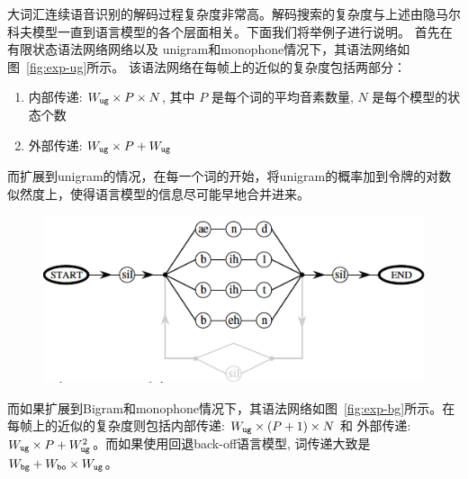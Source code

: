 大词汇连续语音识别的解码过程复杂度非常高。解码搜索的复杂度与上述由隐马尔科夫模型一直到语言模型的各个层面相关。下面我们将举例子进行说明。
首先在有限状态语法网络网络以及 unigram和monophone情况下，其语法网络如图~\ref{fig:exp-ug}所示。
该语法网络在每帧上的近似的复杂度包括两部分：
\begin{enumerate}
\item 内部传递: $W_{\tt ug}\times P\times N$, 其中 $P$ 是每个词的平均音素数量, $N$ 是每个模型的状态个数
\item 外部传递: $W_{\tt ug}\times P + W_{\tt ug}$ 
\end{enumerate}
而扩展到unigram的情况，在每一个词的开始，将unigram的概率加到令牌的对数似然度上，使得语言模型的信息尽可能早地合并进来。

\begin{figure}[!htp]
  \centering
    \captionstyle{\centering}
    \includegraphics[clip=true, width=\textwidth]{figure/ug.png}
\end{figure}

而如果扩展到Bigram和monophone情况下，其语法网络如图~\ref{fig:exp-bg}所示。在每帧上的近似的复杂度则包括内部传递: $W_{\tt ug}\times (P+1)\times N$ 和 外部传递: $W_{\tt ug}\times P + W_{\tt ug}^2$。而如果使用回退back-off语言模型, 词传递大致是 $W_{\tt bg}+W_{\tt bo}\times W_{\tt ug}$。

